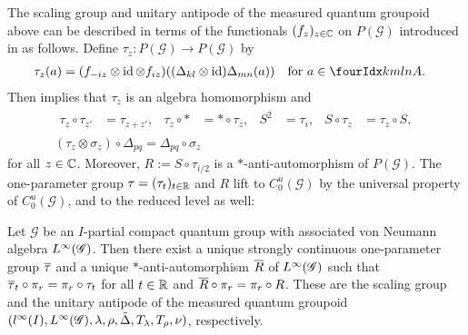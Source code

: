 The scaling group and unitary antipode of the measured quantum
groupoid above can be described in terms of the functionals
$(f_{z})_{z\in \mathbb{C}}$ on $P(\mathscr{G})$ introduced in \cite[Theorem
2.25]{DCT1} as follows.  Define $\tau_{z} \colon P(\mathscr{G}) \to
P(\mathscr{G})$ by
\begin{align*}
\tau_{z}(a) &= (f_{-iz} \otimes \id \otimes f_{iz})((\Delta_{kl}
\otimes \id)\Delta_{mn}(a)) \quad \text{for } a\in \Gr{A}{k}{l}{m}{n}.
\end{align*}
Then \cite[Theorem 2.25]{DCT1} implies that $\tau_{z}$ is an algebra
homomorphism and
\begin{gather} \label{eq:alg-scale}
  \begin{aligned}
    \tau_{z} \circ \tau_{z'} &= \tau_{z+z'}, & \tau_{z}\circ \ast &=
    \ast\circ \tau_{\overline{z}}, & S^{2} &= \tau_{i}, & S \circ
    \tau_{z} &= \tau_{z} \circ S,
  \end{aligned}
 \\  \label{eq:alg-mod-aut-delta} (\tau_{z} \otimes \sigma_{z})
    \circ \Delta_{pq} = \Delta_{pq} \circ \sigma_{z}
  \end{gather}
for all $z\in \mathbb{C}$. Moreover, $R:=S\circ
\tau_{i/2}$ is a $*$-anti-automorphism of $P(\mathscr{G})$.  The
one-parameter group $\tau=(\tau_{t})_{t\in \mathbb{R}}$ and $R$ lift to
$C^{u}_{0}(\mathscr{G})$ by the universal property of
$C^{u}_{0}(\mathscr{G})$, and to the reduced level as well:
\begin{Prop}
  Let $\mathscr{G}$ be an $I$-partial compact quantum group with
  associated von Neumann algebra $L^{\infty}(\mathscr{G})$. Then there exist
a unique strongly continuous one-parameter group $\overline{\tau}$ and
 a unique $*$-anti-automorphism $\overline{R}$ of $L^{\infty}(\mathscr{G})$ such that
 $\overline{\tau}_{t} \circ \pi_{r} = \pi_{r} \circ
\tau_{t}$ for  all $t\in \mathbb{R}$ and
$\overline{R} \circ \pi_{r} = \pi_{r} \circ R$.
 These are the scaling group and the unitary antipode of the measured
 quantum groupoid $(l^{\infty}(I),L^{\infty}(\mathscr{G}), \lambda,\rho,\tilde\Delta,
 T_{\lambda},T_{\rho},\nu)$, respectively.
\end{Prop}
